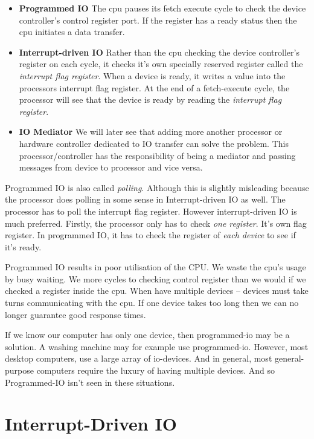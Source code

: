 \begin{itemize}   
\renewcommand{\labelitemi}{$\Box$}
\item \textbf{Programmed IO} 
The cpu pauses its fetch execute cycle to check the device controller’s control register port. 
If the register has a ready status then the cpu initiates a data transfer. 
\item \textbf{Interrupt-driven IO} 
Rather than the cpu checking the device controller's register on each cycle, it 
checks it's own specially reserved register called the \textit{interrupt flag register}. 
When a device is ready, it writes a value into the processors interrupt flag register.
At the end of a fetch-execute cycle, the processor will see that the device is ready 
by reading the \textit{interrupt flag register}. 
\item \textbf{IO Mediator} 
We will later see that adding more another processor or hardware controller dedicated 
to IO transfer can solve the problem. This processor/controller has the responsibility 
of being a mediator and passing messages from device to processor and vice versa. 
\end{itemize}

Programmed IO is also called \textit{polling}. Although this is slightly misleading because 
the processor does polling in some sense in Interrupt-driven IO as well. The processor 
has to poll the interrupt flag register. However interrupt-driven IO is much preferred.
Firstly, the processor only has to check \textit{one register}. 
It's own flag register. In programmed IO, it has to check the register 
of \textit{each device} to see if it's ready. 

Programmed IO results in poor utilisation of the CPU. 
We waste the cpu’s usage by busy waiting. We more cycles to checking control register than 
we would if we checked a register inside the cpu. 
When have multiple devices – devices must take turns communicating with the cpu. 
If one device takes too long then we can no longer guarantee good response times.

If we know our computer has only one device, then programmed-io may be a solution. A washing machine may for example use programmed-io. However, most desktop computers, use a large array of io-devices. And in general, most general-purpose computers require the luxury of having multiple devices. And so Programmed-IO isn’t seen in these situations. 


\section{Interrupt-Driven IO}

